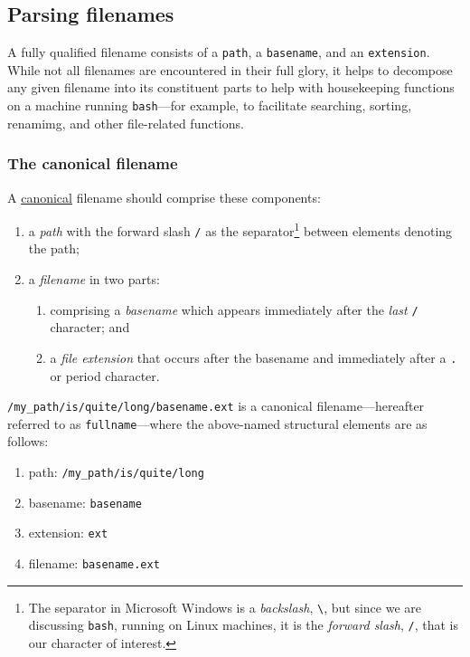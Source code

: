 \documentclass[
  a4paper,
]{article}
\providecommand{\tightlist}{%
  \setlength{\itemsep}{0pt}\setlength{\parskip}{0pt}}
\begin{document}
\hypertarget{parsing-filenames}{%
\subsection{Parsing filenames}\label{parsing-filenames}}

A fully qualified filename consists of a \texttt{path}, a
\texttt{basename}, and an \texttt{extension}. While not all filenames
are encountered in their full glory, it helps to decompose any given
filename into its constituent parts to help with housekeeping functions
on a machine running \texttt{bash}---for example, to facilitate
searching, sorting, renamimg, and other file-related functions.

\hypertarget{the-canonical-filename}{%
\subsubsection{The canonical filename}\label{the-canonical-filename}}

A \href{https://www.thefreedictionary.com/canonical}{canonical} filename
should comprise these components:

\begin{enumerate}
\tightlist
\item
  a \emph{path} with the forward slash \texttt{/} as the
  separator\footnote{The separator in Microsoft Windows is a
    \emph{backslash}, \texttt{\textbackslash{}}, but since we are
    discussing \texttt{bash}, running on Linux machines, it is the
    \emph{forward slash}, \texttt{/}, that is our character of interest.}
  between elements denoting the path;
\item
  a \emph{filename} in two parts:

  \begin{enumerate}
  \def\labelenumii{(\alph{enumii})}
  \tightlist
  \item
    comprising a \emph{basename} which appears immediately after the
    \emph{last} \texttt{/} character; and
  \item
    a \emph{file extension} that occurs after the basename and
    immediately after a \texttt{.} or period character.
  \end{enumerate}
\end{enumerate}

\texttt{/my\_path/is/quite/long/basename.ext} is a canonical
filename---hereafter referred to as \texttt{fullname}---where the
above-named structural elements are as follows:

\begin{enumerate}
\tightlist
\item
  path: \texttt{/my\_path/is/quite/long}
\item
  basename: \texttt{basename}
\item
  extension: \texttt{ext}
\item
  filename: \texttt{basename.ext}
\end{enumerate}
\end{document}
